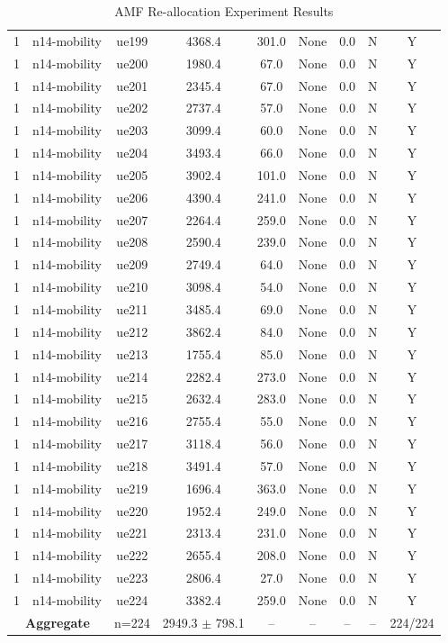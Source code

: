 \begin{table}[ht]
\begin{tabular}{|c|c|c|c|c|c|c|c|c|}
1 & n14-mobility & ue199 & 4368.4 & 301.0 & None & 0.0 & N & Y \\
1 & n14-mobility & ue200 & 1980.4 & 67.0 & None & 0.0 & N & Y \\
1 & n14-mobility & ue201 & 2345.4 & 67.0 & None & 0.0 & N & Y \\
1 & n14-mobility & ue202 & 2737.4 & 57.0 & None & 0.0 & N & Y \\
1 & n14-mobility & ue203 & 3099.4 & 60.0 & None & 0.0 & N & Y \\
1 & n14-mobility & ue204 & 3493.4 & 66.0 & None & 0.0 & N & Y \\
1 & n14-mobility & ue205 & 3902.4 & 101.0 & None & 0.0 & N & Y \\
1 & n14-mobility & ue206 & 4390.4 & 241.0 & None & 0.0 & N & Y \\
1 & n14-mobility & ue207 & 2264.4 & 259.0 & None & 0.0 & N & Y \\
1 & n14-mobility & ue208 & 2590.4 & 239.0 & None & 0.0 & N & Y \\
1 & n14-mobility & ue209 & 2749.4 & 64.0 & None & 0.0 & N & Y \\
1 & n14-mobility & ue210 & 3098.4 & 54.0 & None & 0.0 & N & Y \\
1 & n14-mobility & ue211 & 3485.4 & 69.0 & None & 0.0 & N & Y \\
1 & n14-mobility & ue212 & 3862.4 & 84.0 & None & 0.0 & N & Y \\
1 & n14-mobility & ue213 & 1755.4 & 85.0 & None & 0.0 & N & Y \\
1 & n14-mobility & ue214 & 2282.4 & 273.0 & None & 0.0 & N & Y \\
1 & n14-mobility & ue215 & 2632.4 & 283.0 & None & 0.0 & N & Y \\
1 & n14-mobility & ue216 & 2755.4 & 55.0 & None & 0.0 & N & Y \\
1 & n14-mobility & ue217 & 3118.4 & 56.0 & None & 0.0 & N & Y \\
1 & n14-mobility & ue218 & 3491.4 & 57.0 & None & 0.0 & N & Y \\
1 & n14-mobility & ue219 & 1696.4 & 363.0 & None & 0.0 & N & Y \\
1 & n14-mobility & ue220 & 1952.4 & 249.0 & None & 0.0 & N & Y \\
1 & n14-mobility & ue221 & 2313.4 & 231.0 & None & 0.0 & N & Y \\
1 & n14-mobility & ue222 & 2655.4 & 208.0 & None & 0.0 & N & Y \\
1 & n14-mobility & ue223 & 2806.4 & 27.0 & None & 0.0 & N & Y \\
1 & n14-mobility & ue224 & 3382.4 & 259.0 & None & 0.0 & N & Y \\
\multicolumn{2}{|c|}{\textbf{Aggregate}} & n=224 & 2949.3 $\pm$ 798.1 & -- & -- & -- & -- & 224/224 \\
\hline
\end{tabular}
\caption{AMF Re-allocation Experiment Results}
\label{tab:amf_realloc}
\end{table}
